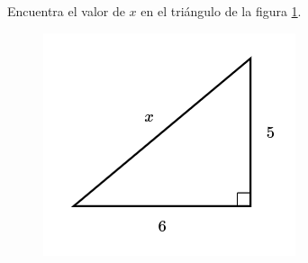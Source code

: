 Encuentra el valor de $x$ en el triángulo de la figura \ref{fig:lados_pitagoras_13}.

\begin{minipage}[t][][t]{0.35\textwidth}
    \begin{figure}[H]
        \centering
        \includegraphics[width=0.9\linewidth]{../images/lados_pitagoras_13.png}

        \caption{}
        \label{fig:lados_pitagoras_13}
    \end{figure}
\end{minipage}\hfill
